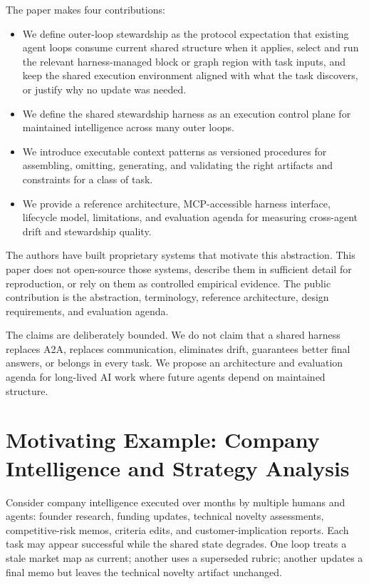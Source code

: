 \documentclass{article}
\begin{document}
The paper makes four contributions:
\begin{itemize}[leftmargin=*]
\item We define outer-loop stewardship as the protocol expectation that existing agent loops consume current shared structure when it applies, select and run the relevant harness-managed block or graph region with task inputs, and keep the shared execution environment aligned with what the task discovers, or justify why no update was needed.
\item We define the shared stewardship harness as an execution control plane for maintained intelligence across many outer loops.
\item We introduce executable context patterns as versioned procedures for assembling, omitting, generating, and validating the right artifacts and constraints for a class of task.
\item We provide a reference architecture, MCP-accessible harness interface, lifecycle model, limitations, and evaluation agenda for measuring cross-agent drift and stewardship quality.
\end{itemize}

The authors have built proprietary systems that motivate this abstraction. This paper does not open-source those systems, describe them in sufficient detail for reproduction, or rely on them as controlled empirical evidence. The public contribution is the abstraction, terminology, reference architecture, design requirements, and evaluation agenda.

The claims are deliberately bounded. We do not claim that a shared harness replaces A2A, replaces communication, eliminates drift, guarantees better final answers, or belongs in every task. We propose an architecture and evaluation agenda for long-lived AI work where future agents depend on maintained structure.

\section{Motivating Example: Company Intelligence and Strategy Analysis}

Consider company intelligence executed over months by multiple humans and agents: founder research, funding updates, technical novelty assessments, competitive-risk memos, criteria edits, and customer-implication reports. Each task may appear successful while the shared state degrades. One loop treats a stale market map as current; another uses a superseded rubric; another updates a final memo but leaves the technical novelty artifact unchanged.
\end{document}
